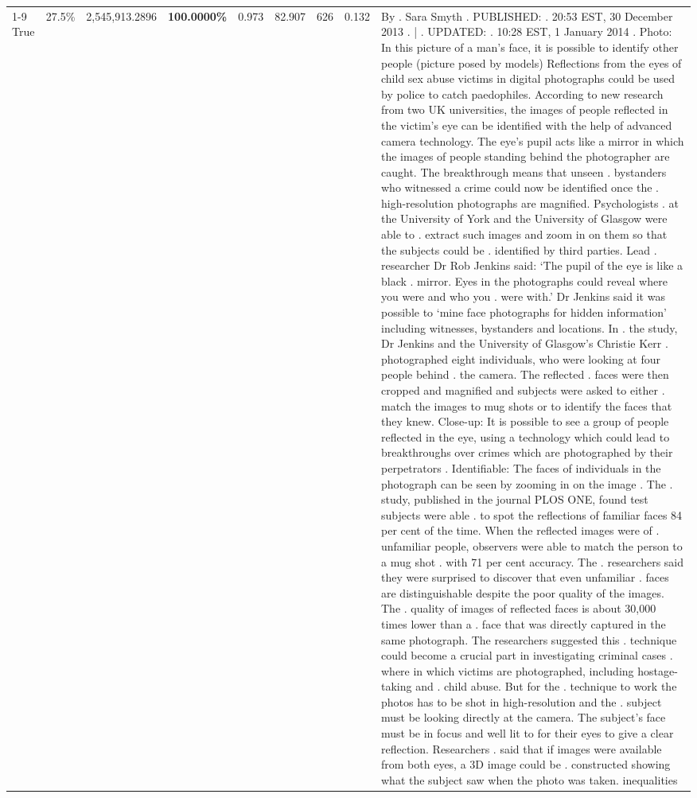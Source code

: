 \begin{table}[H]
\begin{tabular}{lllrlllll}
\cline{1-9} \cline{2-9}
True & 27.5\% & 2,545,913.2896 & \bfseries \color{red} 100.0000\% & 0.973 & 82.907 & 626 & 0.132 & By . Sara Smyth . PUBLISHED: . 20:53 EST, 30 December 2013 . | . UPDATED: . 10:28 EST, 1 January 2014 . Photo: In this picture of a man's face, it is possible to identify other people (picture posed by models) Reflections from the eyes of child sex abuse victims in digital photographs could be used by police to catch paedophiles. According to new research from two UK universities, the images of people reflected in the victim's eye can be identified with the help of advanced camera technology. The eye's pupil acts like a mirror in which the images of people standing behind the photographer are caught. The breakthrough means that unseen . bystanders who witnessed a crime could now be identified once the . high-resolution photographs are magnified. Psychologists . at the University of York and the University of Glasgow were able to . extract such images and zoom in on them so that the subjects could be . identified by third parties. Lead . researcher Dr Rob Jenkins said: ‘The pupil of the eye is like a black . mirror. Eyes in the photographs could reveal where you were and who you . were with.' Dr Jenkins said it was possible to ‘mine face photographs for hidden information' including witnesses, bystanders and locations. In . the study, Dr Jenkins and the University of Glasgow's Christie Kerr . photographed eight individuals, who were looking at four people behind . the camera. The reflected . faces were then cropped and magnified and subjects were asked to either . match the images to mug shots or to identify the faces that they knew. Close-up: It is possible to see a group of people reflected in the eye, using a technology which could lead to breakthroughs over crimes which are photographed by their perpetrators . Identifiable: The faces of individuals in the photograph can be seen by zooming in on the image . The . study, published in the journal PLOS ONE, found test subjects were able . to spot the reflections of familiar faces 84 per cent of the time. When the reflected images were of . unfamiliar people, observers were able to match the person to a mug shot . with 71 per cent accuracy. The . researchers said they were surprised to discover that even unfamiliar . faces are distinguishable despite the poor quality of the images. The . quality of images of reflected faces is about 30,000 times lower than a . face that was directly captured in the same photograph. The researchers suggested this . technique could become a crucial part in investigating criminal cases . where in which victims are photographed, including hostage-taking and . child abuse. But for the . technique to work the photos has to be shot in high-resolution and the . subject must be looking directly at the camera. The subject's face must be in focus and well lit to for their eyes to give a clear reflection. Researchers . said that if images were available from both eyes, a 3D image could be . constructed showing what the subject saw when the photo was taken. inequalities \\

\end{tabular}
\end{table}
